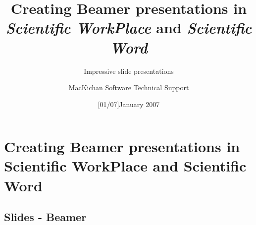 \documentclass[notes=show]{beamer}%
\begin{document}
\title{Creating Beamer presentations in \textsl{Scientific WorkPlace\/}{} and
\textsl{Scientific Word}{}}
\subtitle{Impressive slide presentations}
\author{MacKichan Software Technical Support}
\date{[01/07]January 2007}
\maketitle

\section{Creating Beamer presentations in Scientific WorkPlace and Scientific
Word}

\subsection{Slides - Beamer}%
\end{document}
